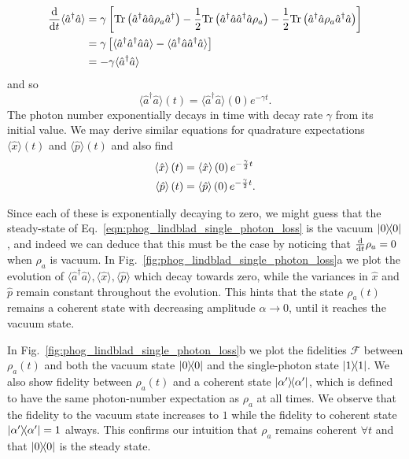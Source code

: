 \begin{align}
\ddt \langle \hat{a}^\dagger \hat{a}\rangle &= \gamma \left[ \text{Tr}\left(\hat{a}^\dagger \hat{a} \hat{a} \rho_a \hat{a}^\dagger \right) - \frac{1}{2} \text{Tr}\left(\hat{a}^\dagger \hat{a} \hat{a}^\dagger \hat{a} \rho_a\right) - \frac{1}{2} \text{Tr}\left(\hat{a}^\dagger \hat{a} \rho_a \hat{a}^\dagger \hat{a}\right)\right] \notag \\
%
&= \gamma \left[ \langle \hat{a}^\dagger \hat{a}^\dagger \hat{a}\hat{a}\rangle - \langle \hat{a}^\dagger \hat{a} \hat{a}^\dagger \hat{a}\rangle \right] \notag \\
%
&= - \gamma \langle \hat{a}^\dagger \hat{a}\rangle
\end{align}
\noindent and so
\begin{equation}\label{eqn:phog_single_photon_loss_number_expectation}
\langle\hat{a}^\dagger \hat{a} \rangle \left(t\right) = \langle \hat{a}^\dagger \hat{a}\rangle \left(0\right) e^{- \gamma t}.
\end{equation}
The photon number exponentially decays in time with decay rate $\gamma$ from its initial value. We may derive similar equations for quadrature expectations $\langle\hat{x}\rangle\left(t\right)$ and $\langle\hat{p}\rangle\left(t\right)$ and also find 
\begin{align}\label{eqn:phog_single_photon_loss_quadrature_expectation}
 \langle \hat{x}\rangle\left(t\right) &= \langle \hat{x}\rangle\left(0\right) e^{- \frac{\gamma}{2} t} \notag \\
%
 \langle \hat{p}\rangle\left(t\right) &= \langle \hat{p}\rangle \left(0\right) e^{- \frac{\gamma}{2} t}.
\end{align}

\noindent Since each of these is exponentially decaying to zero, we might guess that the steady-state of Eq.~\ref{eqn:phog_lindblad_single_photon_loss} is the vacuum $\dyad{0}$, and indeed we can deduce that this must be the case by noticing that $\frac{\mathrm{d}}{\mathrm{d}t} \rho_a = 0$ when $\rho_a$ is vacuum. In Fig.~\ref{fig:phog_lindblad_single_photon_loss}a we plot the evolution of $\langle\hat{a}^\dagger \hat{a}\rangle, \langle \hat{x}\rangle, \langle \hat{p}\rangle$ which decay towards zero, while the variances in $\hat{x}$ and $\hat{p}$ remain constant throughout the evolution. This hints that the state $\rho_a\left(t\right)$ remains a coherent state with decreasing amplitude $\alpha\rightarrow0$, until it reaches the vacuum state.

In Fig.~\ref{fig:phog_lindblad_single_photon_loss}b we plot the fidelities $\mathcal{F}$ between $\rho_a\left(t\right)$ and both the vacuum state $\dyad{0}$ and the single-photon state $\dyad{1}$. We also show fidelity between $\rho_a\left(t\right)$ and a coherent state $\dyad{\alpha^\prime}$, which is defined to have the same photon-number expectation as $\rho_a$ at all times. We observe that the fidelity to the vacuum state increases to $1$ while the fidelity to coherent state $\dyad{\alpha^\prime}=1$ always. This confirms our intuition that $\rho_a$ remains coherent $\forall t$ and that $\dyad{0}$ is the steady state. 


